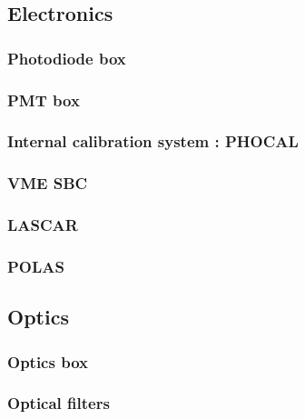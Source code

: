\documentclass[UKenglish,texlive=2013]{\ATLASLATEXPATH atlasdoc}
\begin{document}
\subsection{Electronics}

\subsubsection{Photodiode box}



\subsubsection{PMT box}



\subsubsection{Internal calibration system : PHOCAL}



\subsubsection{VME SBC}



\subsubsection{LASCAR}



\subsubsection{POLAS}



\subsection{Optics}

\subsubsection{Optics box}



\subsubsection{Optical filters}
\end{document}
